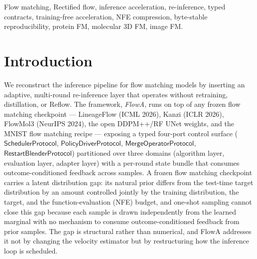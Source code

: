 \documentclass[journal,twocolumn,final]{IEEEtran}
\begin{document}
\begin{IEEEkeywords}
Flow matching, Rectified flow, inference acceleration, re-inference, typed
contracts, training-free acceleration, NFE compression, byte-stable
reproducibility, protein FM, molecular 3D FM, image FM.
\end{IEEEkeywords}

\section{Introduction}\label{sec:intro}

We reconstruct the inference pipeline for flow matching models
\cite{lipman2023flow,liu2022rectified} by inserting an adaptive, multi-round
re-inference layer that operates without retraining, distillation, or Reflow.
The framework, \emph{FlowA}, runs on top of any frozen flow matching
checkpoint --- LineageFlow (ICML 2026), Kanzi (ICLR 2026), FlowMol3
(NeurIPS 2024), the open DDPM++/RF UNet weights, and the MNIST flow matching
recipe --- exposing a typed four-port control surface
($\mathsf{SchedulerProtocol}$, $\mathsf{PolicyDriverProtocol}$,
$\mathsf{MergeOperatorProtocol}$, $\mathsf{RestartBlenderProtocol}$) partitioned
over three domains (algorithm layer, evaluation layer, adapter layer) with a
per-round state bundle that consumes outcome-conditioned feedback across
samples. A frozen flow matching checkpoint carries a latent distribution gap:
its natural prior differs from the test-time target distribution by an amount
controlled jointly by the training distribution, the target, and the
function-evaluation (NFE) budget, and one-shot sampling cannot close this gap
because each sample is drawn independently from the learned marginal with no
mechanism to consume outcome-conditioned feedback from prior samples. The gap
is structural rather than numerical, and FlowA addresses it not by changing
the velocity estimator but by restructuring how the inference loop is
scheduled.
\end{document}
